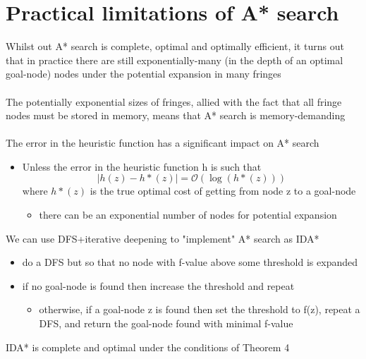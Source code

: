 \documentclass{article}[18pt]
\begin{document}
\section{Practical limitations of A* search}
Whilst out A* search is complete, optimal and optimally efficient, it turns out that in practice there are still exponentially-many (in the depth of an optimal goal-node) nodes under the potential expansion in many fringes\\
\\
The potentially exponential sizes of fringes, allied with the fact that all fringe nodes must be stored in memory, means that A* search is memory-demanding\\
\\
The error in the heuristic function has a significant impact on A* search
\begin{itemize}
	\item Unless the error in the heuristic function h is such that
	$$|h(z)-h*(z)|=\mathcal{O}(\log(h*(z)))$$
	where $h*(z)$ is the true optimal cost of getting from node z to a goal-node
	\begin{itemize}
		\item there can be an exponential number of nodes for potential expansion
	\end{itemize}
\end{itemize}
We can use DFS+iterative deepening to "implement" A* search as IDA*
\begin{itemize}
	\item do a DFS but so that no node with f-value above some threshold is expanded
	\item if no goal-node is found then increase the threshold and repeat
	\begin{itemize}
		\item otherwise, if a goal-node z is found then set the threshold to f(z), repeat a DFS, and return the goal-node found with minimal f-value
	\end{itemize}
\end{itemize}
IDA* is complete and optimal under the conditions of Theorem 4
\end{document}
